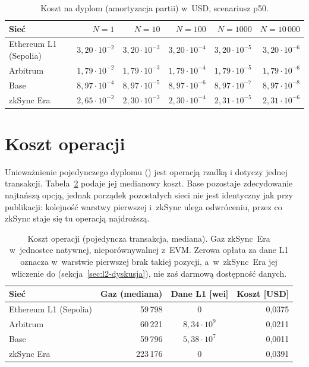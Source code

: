 \begin{table}[H]
  \centering
  \caption{Koszt na dyplom (amortyzacja partii) w~USD, scenariusz p50.}
  \label{tab:per-diploma}
  \begin{tabular}{lrrrrr}
  \toprule
  Sieć & $N=1$ & $N=10$ & $N=100$ & $N=1000$ & $N=10\,000$ \\
  \midrule
  Ethereum L1 (Sepolia) & $3{,}20\cdot10^{-2}$ & $3{,}20\cdot10^{-3}$ & $3{,}20\cdot10^{-4}$ & $3{,}20\cdot10^{-5}$ & $3{,}20\cdot10^{-6}$ \\
  Arbitrum     & $1{,}79\cdot10^{-2}$ & $1{,}79\cdot10^{-3}$ & $1{,}79\cdot10^{-4}$ & $1{,}79\cdot10^{-5}$ & $1{,}79\cdot10^{-6}$ \\
  Base         & $8{,}97\cdot10^{-4}$ & $8{,}97\cdot10^{-5}$ & $8{,}97\cdot10^{-6}$ & $8{,}97\cdot10^{-7}$ & $8{,}97\cdot10^{-8}$ \\
  zkSync Era   & $2{,}65\cdot10^{-2}$ & $2{,}30\cdot10^{-3}$ & $2{,}30\cdot10^{-4}$ & $2{,}31\cdot10^{-5}$ & $2{,}31\cdot10^{-6}$ \\
  \bottomrule
  \end{tabular}
\end{table}

\section{Koszt operacji }
\label{sec:l2-revoke}

Unieważnienie pojedynczego dyplomu () jest operacją rzadką i
dotyczy jednej transakcji. Tabela~\ref{tab:revoke} podaje jej medianowy koszt.
Base pozostaje zdecydowanie najtańszą opcją, jednak porządek pozostałych sieci nie
jest identyczny jak przy publikacji: kolejność warstwy pierwszej i~zkSync ulega
odwróceniu, przez co zkSync staje się tu operacją najdroższą.

\begin{table}[H]
  \centering
  \caption[Koszt operacji ]{Koszt operacji  (pojedyncza transakcja,
  mediana). Gaz zkSync~Era w~jednostce natywnej, nieporównywalnej z~EVM.
  Zerowa opłata za dane L1 oznacza w~warstwie pierwszej brak takiej pozycji,
  a~w~zkSync~Era jej wliczenie do 
  (sekcja~\ref{sec:l2-dyskusja}), nie zaś darmową dostępność danych.}
  \label{tab:revoke}
  \begin{tabular}{lrcr}
  \toprule
  Sieć & Gaz (mediana) & Dane L1 [wei] & Koszt [USD] \\
  \midrule
  Ethereum L1 (Sepolia) &  59\,798 & 0                    & 0{,}0375 \\
  Arbitrum     &  60\,221 & $8{,}34\cdot10^{9}$  & 0{,}0211 \\
  Base         &  59\,796 & $5{,}38\cdot10^{7}$  & 0{,}0011 \\
  zkSync Era   & 223\,176 & 0                    & 0{,}0391 \\
  \bottomrule
  \end{tabular}
\end{table}

